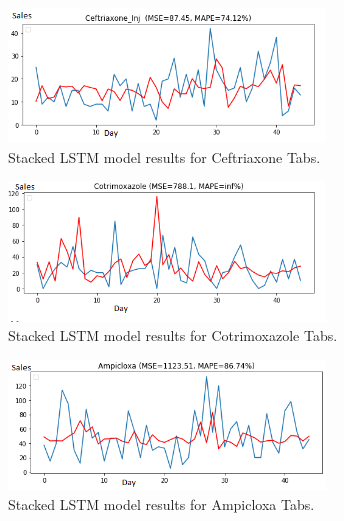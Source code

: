 \documentclass[12pt]{report}
\begin{document}
\begin{figure}[H]%
  \begin {center}
  \includegraphics[width=0.75\textwidth]{images/stacked (2)B.png}
  \caption{Stacked LSTM model results for Ceftriaxone Tabs.}
  \label{fig:ecg}
  \end {center}
  \end{figure}
 
  \begin{figure}[H]%
    \begin {center}
    \includegraphics[width=0.75\textwidth]{images/stacked (2)C.png}
    \caption{Stacked LSTM model results for Cotrimoxazole Tabs.}
    \label{fig:ecg}
    \end {center}
    \end{figure}
    

\begin{figure}[H]%
\begin {center}
\includegraphics[width=0.75\textwidth]{images/stacked (3)A.png}
\caption{Stacked LSTM model results for Ampicloxa Tabs.}
\label{fig:ecg}
\end {center}
\end{figure}
\end{document}

